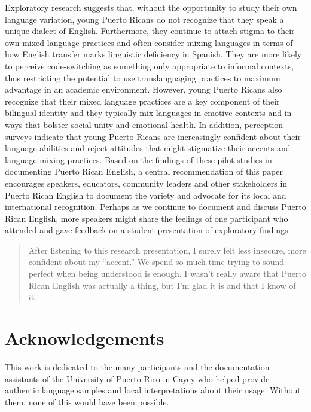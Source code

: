 \documentclass[output=paper,colorlinks,citecolor=brown]{langscibook}
\begin{document}
Exploratory research suggests that, without the opportunity to study their own language variation, young Puerto Ricans do not recognize that they speak a unique dialect of English. Furthermore, they continue to attach stigma to their own mixed language practices and often consider mixing languages in terms of how English transfer marks linguistic deficiency in Spanish. They are more likely to perceive code-switching as something only appropriate to informal contexts, thus restricting the potential to use translanguaging practices to maximum advantage in an academic environment. However, young Puerto Ricans also recognize that their mixed language practices are a key component of their bilingual identity and they typically mix languages in emotive contexts and in ways that bolster social unity and emotional health. In addition, perception surveys indicate that young Puerto Ricans are increasingly confident about their language abilities and reject attitudes that might stigmatize their accents and language mixing practices. Based on the findings of these pilot studies in documenting Puerto Rican English, a central recommendation of this paper encourages speakers, educators, community leaders and other stakeholders in Puerto Rican English to document the variety and advocate for its local and international recognition. Perhaps as we continue to document and discuss Puerto Rican English, more speakers might share the feelings of one participant who attended and gave feedback on a student presentation of exploratory findings:

\begin{quote}
After listening to this research presentation, I surely felt less insecure, more confident about my “accent.” We spend so much time trying to sound perfect when being understood is enough. I wasn’t really aware that Puerto Rican English was actually a thing, but I’m glad it is and that I know of it.
\end{quote}

\section*{Acknowledgements}
  This work is dedicated to the many participants and the documentation assistants of the University of Puerto Rico in Cayey who helped provide authentic language samples and local interpretations about their usage. Without them, none of this would have been possible.


{\sloppy\printbibliography[heading=subbibliography,notkeyword=this]}
\end{document}
